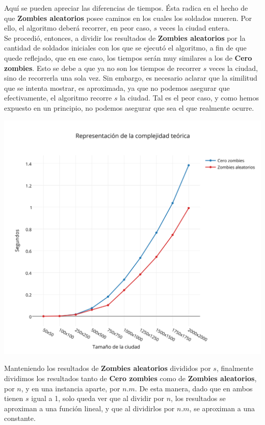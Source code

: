 Aquí se pueden apreciar las diferencias de tiempos. Ésta radica en el hecho de que \textbf{Zombies aleatorios} posee caminos en los cuales los soldados mueren. Por ello, el algoritmo deberá recorrer, en peor caso, $s$ veces la ciudad entera.\\

Se procedió, entonces, a dividir los resultados de \textbf{Zombies aleatorios} por la cantidad de soldados iniciales con los que se ejecutó el algoritmo, a fin de que quede reflejado, que en ese caso, los tiempos serán muy similares a los de \textbf{Cero zombies}. Esto se debe a que ya no son los tiempos de recorrer $s$ veces la ciudad, sino de recorrerla una sola vez.
Sin embargo, es necesario aclarar que la similitud que se intenta mostrar, es aproximada, ya que no podemos asegurar que efectivamente, el algoritmo recorre $s$ la ciudad. Tal es el peor caso, y como hemos expuesto en un principio, no podemos asegurar que sea el que realmente ocurre.

\includegraphics[width=15cm,keepaspectratio=yes]{imagenes/ej2/zaczados.png}

Manteniendo los resultados de \textbf{Zombies aleatorios} divididos por $s$, finalmente dividimos los resultados tanto de \textbf{Cero zombies} como de \textbf{Zombies aleatorios}, por $n$, y en una instancia aparte, por $n.m$.
De esta manera, dado que en ambos tienen $s$ igual a 1, solo queda ver que al dividir por $n$, los resultados se aproximan a una función lineal, y que al dividirlos por $n.m$, se aproximan a una constante.

